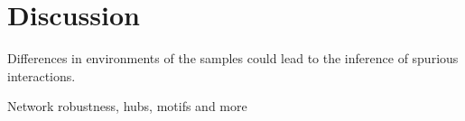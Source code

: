 
\section*{Discussion}

  Differences in environments of the samples could lead to the inference of spurious interactions.

  Network robustness, hubs, motifs and more
